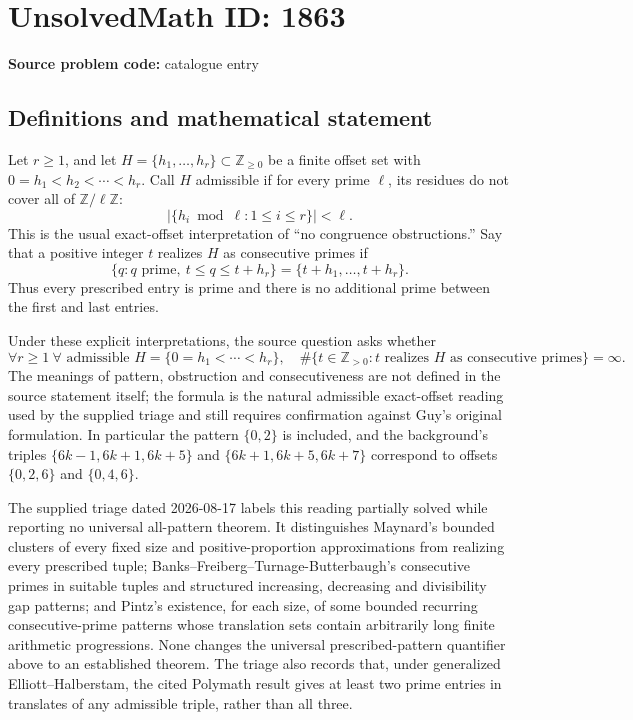 \documentclass[11pt]{article}
\newcommand{\Z}{\mathbb{Z}}
\begin{document}
\section*{UnsolvedMath ID: 1863}
\textbf{Source problem code:} catalogue entry
\subsection{Definitions and mathematical statement}
Let \(r\geq1\), and let \(H=\{h_1,\ldots,h_r\}\subset\Z_{\geq0}\) be a finite offset set with \(0=h_1<h_2<\cdots<h_r\). Call \(H\) admissible if for every prime \(\ell\), its residues do not cover all of \(\Z/\ell\Z\):
\[
|\{h_i\bmod\ell:1\leq i\leq r\}|<\ell.
\]
This is the usual exact-offset interpretation of ``no congruence obstructions.'' Say that a positive integer \(t\) realizes \(H\) as consecutive primes if
\[
\{q:q\text{ prime},\ t\leq q\leq t+h_r\}
=\{t+h_1,\ldots,t+h_r\}.
\]
Thus every prescribed entry is prime and there is no additional prime between the first and last entries.

Under these explicit interpretations, the source question asks whether
\[
\forall r\geq1\ \forall\text{ admissible }H=\{0=h_1<\cdots<h_r\},
\quad
\#\{t\in\Z_{>0}:t\text{ realizes }H\text{ as consecutive primes}\}=\infty.
\]
The meanings of pattern, obstruction and consecutiveness are not defined in the source statement itself; the formula is the natural admissible exact-offset reading used by the supplied triage and still requires confirmation against Guy's original formulation. In particular the pattern \(\{0,2\}\) is included, and the background's triples \(\{6k-1,6k+1,6k+5\}\) and \(\{6k+1,6k+5,6k+7\}\) correspond to offsets \(\{0,2,6\}\) and \(\{0,4,6\}\).

The supplied triage dated 2026-08-17 labels this reading partially solved while reporting no universal all-pattern theorem. It distinguishes Maynard's bounded clusters of every fixed size and positive-proportion approximations from realizing every prescribed tuple; Banks--Freiberg--Turnage-Butterbaugh's consecutive primes in suitable tuples and structured increasing, decreasing and divisibility gap patterns; and Pintz's existence, for each size, of some bounded recurring consecutive-prime patterns whose translation sets contain arbitrarily long finite arithmetic progressions. None changes the universal prescribed-pattern quantifier above to an established theorem. The triage also records that, under generalized Elliott--Halberstam, the cited Polymath result gives at least two prime entries in translates of any admissible triple, rather than all three.
\end{document}
